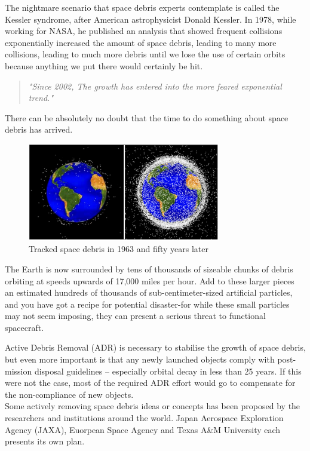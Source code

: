 The nightmare scenario that space debris experts contemplate is called the Kessler syndrome, after American astrophysicist Donald Kessler. In 1978, while working for NASA, he published an analysis\cite{kessler1978collision} that showed frequent collisions exponentially increased the amount of space debris, leading to many more collisions, leading to much more debris until we lose the use of certain orbits because anything we put there would certainly be hit.

\begin{quote}
\em{"Since 2002, The growth has entered into the more feared exponential trend."}
\end{quote}
There can be absolutely no doubt that the time to do something about space debris has arrived.

\begin{figure}[ht]
\centering
\includegraphics[width=0.75\textwidth]{fig/motivation/TrackedSpaceDebris}
\caption{Tracked space debris in 1963 and fifty years later}
\label{moti-TrackedSpaceDebris}
\end{figure}

The Earth is now surrounded by tens of thousands of sizeable chunks of debris orbiting at speeds upwards of 17,000 miles per hour. Add to these larger pieces an estimated hundreds of thousands of sub-centimeter-sized artificial particles, and you have got a recipe for potential disaster-for while these small particles may not seem imposing, they can present a serious threat to functional spacecraft.


Active Debris Removal (ADR) is necessary to stabilise the growth of space debris, but even more important is that any newly launched objects comply with post-mission disposal guidelines – especially orbital decay in less than 25 years. If this were not the case, most of the required ADR effort would go to compensate for the non-compliance of new objects.\\

Some actively removing space debris ideas or concepts has been proposed by the researchers and institutions around the world. Japan Aerospace Exploration Agency (JAXA), Euorpean Space Agency and Texas A\&M University each presents its own plan.

\newpage

